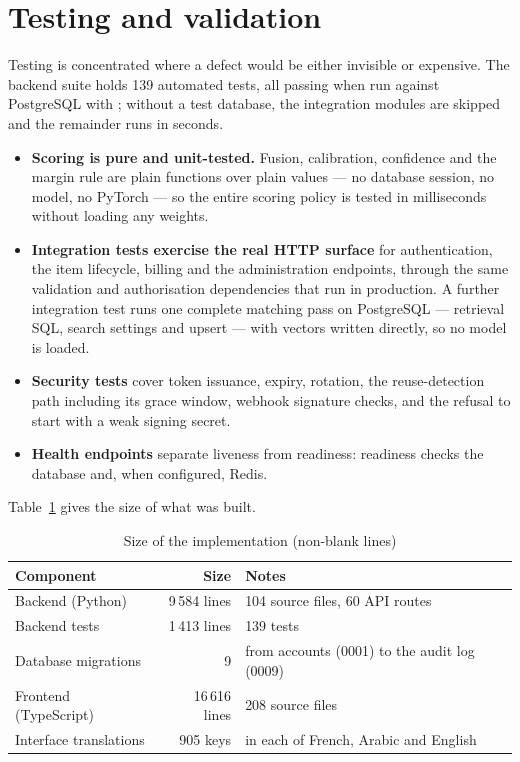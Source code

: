 
\section{Testing and validation}

Testing is concentrated where a defect would be either invisible or expensive.
The backend suite holds 139 automated tests, all passing when run against
PostgreSQL with ; without a test database, the integration
modules are skipped and the remainder runs in seconds.

\begin{itemize}[leftmargin=1.4em,itemsep=3pt]
  \item \textbf{Scoring is pure and unit-tested.} Fusion, calibration,
        confidence and the margin rule are plain functions over plain values ---
        no database session, no model, no PyTorch --- so the entire scoring
        policy is tested in milliseconds without loading any weights.
  \item \textbf{Integration tests exercise the real HTTP surface} for
        authentication, the item lifecycle, billing and the administration
        endpoints, through the same validation and authorisation dependencies
        that run in production. A further integration test runs one complete
        matching pass on PostgreSQL --- retrieval SQL, search settings and
        upsert --- with vectors written directly, so no model is loaded.
  \item \textbf{Security tests} cover token issuance, expiry, rotation, the
        reuse-detection path including its grace window, webhook signature
        checks, and the refusal to start with a weak signing secret.
  \item \textbf{Health endpoints} separate liveness from readiness: readiness
        checks the database and, when configured, Redis.
\end{itemize}

Table~\ref{tab:codebase} gives the size of what was built.

\begin{table}[htbp]
\centering
\caption{Size of the implementation (non-blank lines)}
\label{tab:codebase}
\small
\begin{tabularx}{\textwidth}{@{}X r X@{}}
\toprule
\textbf{Component} & \textbf{Size} & \textbf{Notes} \\
\midrule
Backend (Python)          & 9\,584 lines  & 104 source files, 60 API routes \\
Backend tests             & 1\,413 lines  & 139 tests \\
Database migrations       & 9             & from accounts (0001) to the audit log (0009) \\
Frontend (TypeScript)     & 16\,616 lines & 208 source files \\
Interface translations    & 905 keys      & in each of French, Arabic and English \\
\bottomrule
\end{tabularx}
\end{table}

